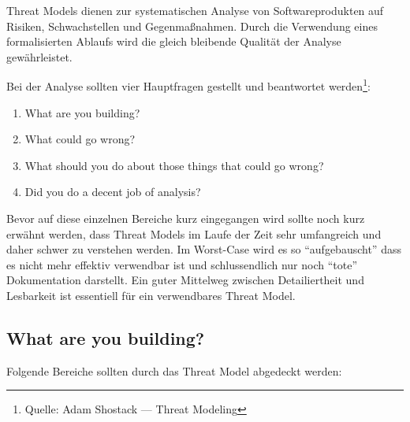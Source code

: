 Threat Models dienen zur systematischen Analyse von Softwareprodukten auf Risiken, Schwachstellen und Gegenmaßnahmen. Durch die Verwendung eines formalisierten Ablaufs wird die gleich bleibende Qualität der Analyse gewährleistet.

Bei der Analyse sollten vier Hauptfragen gestellt und beantwortet werden\footnote{Quelle: Adam Shostack --- Threat Modeling}:

\begin{enumerate}
	\item What are you building?
	\item What could go wrong?
	\item What should you do about those things that could go wrong?
	\item Did you do a decent job of analysis?
\end{enumerate}

Bevor auf diese einzelnen Bereiche kurz eingegangen wird sollte noch kurz erwähnt werden, dass Threat Models im Laufe der Zeit sehr umfangreich und daher schwer zu verstehen werden. Im Worst-Case wird es so ``aufgebauscht'' dass es nicht mehr effektiv verwendbar ist und schlussendlich nur noch ``tote'' Dokumentation darstellt. Ein guter Mittelweg zwischen Detailiertheit und Lesbarkeit ist essentiell für ein verwendbares Threat Model.

\subsection{What are you building?}

Folgende Bereiche sollten durch das Threat Model abgedeckt werden:

